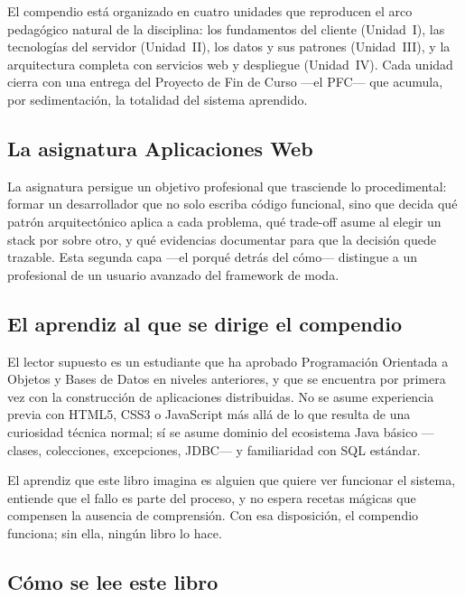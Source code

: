 El compendio est\'a organizado en cuatro unidades que reproducen el arco pedag\'ogico natural de la disciplina: los fundamentos del cliente (Unidad~I), las tecnolog\'ias del servidor (Unidad~II), los datos y sus patrones (Unidad~III), y la arquitectura completa con servicios web y despliegue (Unidad~IV). Cada unidad cierra con una entrega del Proyecto de Fin de Curso ---el PFC--- que acumula, por sedimentaci\'on, la totalidad del sistema aprendido.

\subsection{La asignatura Aplicaciones Web}
\label{sec:u0:contexto:asignatura}

La asignatura persigue un objetivo profesional que trasciende lo procedimental: formar un desarrollador que no solo escriba c\'odigo funcional, sino que decida qu\'e patr\'on arquitect\'onico aplica a cada problema, qu\'e trade-off asume al elegir un stack por sobre otro, y qu\'e evidencias documentar para que la decisi\'on quede trazable. Esta segunda capa ---el porqu\'e detr\'as del c\'omo--- distingue a un profesional de un usuario avanzado del framework de moda.

\subsection{El aprendiz al que se dirige el compendio}
\label{sec:u0:contexto:aprendiz}

El lector supuesto es un estudiante que ha aprobado Programaci\'on Orientada a Objetos y Bases de Datos en niveles anteriores, y que se encuentra por primera vez con la construcci\'on de aplicaciones distribuidas. No se asume experiencia previa con HTML5, CSS3 o JavaScript m\'as all\'a de lo que resulta de una curiosidad t\'ecnica normal; s\'i se asume dominio del ecosistema Java b\'asico ---clases, colecciones, excepciones, JDBC--- y familiaridad con SQL est\'andar.

El aprendiz que este libro imagina es alguien que quiere ver funcionar el sistema, entiende que el fallo es parte del proceso, y no espera recetas m\'agicas que compensen la ausencia de comprensi\'on. Con esa disposici\'on, el compendio funciona; sin ella, ning\'un libro lo hace.

\subsection{C\'omo se lee este libro}
\label{sec:u0:contexto:lectura}

